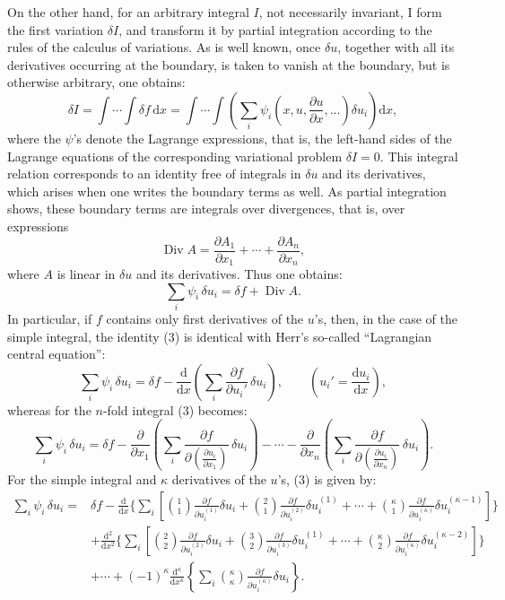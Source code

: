 \documentclass[11pt]{article}
\providecommand{\dd}{\mathrm d}
\providecommand{\Div}{\operatorname{Div}}
\providecommand{\p}{\partial}
\providecommand{\p}{\partial}
\providecommand{\dd}{\mathrm d}
\begin{document}
On the other hand, for an arbitrary integral \(I\), not necessarily invariant, I form the first variation \(\delta I\), and transform it by partial integration according to the rules of the calculus of variations. As is well known, once \(\delta u\), together with all its derivatives occurring at the boundary, is taken to vanish at the boundary, but is otherwise arbitrary, one obtains:
\begin{equation}
\delta I=\int\!\cdots\!\int \delta f\,\dd x
=\int\!\cdots\!\int\left(\sum_i\psi_i\!\left(x,u,\frac{\p u}{\p x},\ldots\right)\delta u_i\right)\dd x,
\tag{2}
\end{equation}
where the \(\psi\)'s denote the Lagrange expressions, that is, the left-hand sides of the Lagrange equations of the corresponding variational problem \(\delta I=0\). This integral relation corresponds to an identity free of integrals in \(\delta u\) and its derivatives, which arises when one writes the boundary terms as well. As partial integration shows, these boundary terms are integrals over divergences, that is, over expressions
\[
\Div A=\frac{\p A_1}{\p x_1}+\cdots+\frac{\p A_n}{\p x_n},
\]
where \(A\) is linear in \(\delta u\) and its derivatives. Thus one obtains:
\begin{equation}
\sum_i\psi_i\,\delta u_i=\delta f+\Div A.
\tag{3}
\end{equation}
In particular, if \(f\) contains only first derivatives of the \(u\)'s, then, in the case of the simple integral, the identity (3) is identical with Herr's so-called ``Lagrangian central equation'':
\begin{equation}
\sum_i \psi_i\,\delta u_i
=\delta f-\frac{\dd}{\dd x}\left(\sum_i\frac{\p f}{\p u_i'}\,\delta u_i\right),
\qquad \left(u_i'=\frac{\dd u_i}{\dd x}\right),
\tag{4}
\end{equation}
whereas for the \(n\)-fold integral (3) becomes:
\begin{equation}
\sum_i\psi_i\,\delta u_i
=
\delta f
-\frac{\p}{\p x_1}\left(\sum_i\frac{\p f}{\p \left(\frac{\p u_i}{\p x_1}\right)}\,\delta u_i\right)
-\cdots
-\frac{\p}{\p x_n}\left(\sum_i\frac{\p f}{\p \left(\frac{\p u_i}{\p x_n}\right)}\,\delta u_i\right).
\tag{5}
\end{equation}
For the simple integral and \(\kappa\) derivatives of the \(u\)'s, (3) is given by:
\begin{equation}
\begin{aligned}
\sum_i\psi_i\,\delta u_i
={}&\delta f
-\frac{\dd}{\dd x}\Bigg\{\sum_i\left[
\binom{1}{1}\frac{\p f}{\p u_i^{(1)}}\delta u_i
+\binom{2}{1}\frac{\p f}{\p u_i^{(2)}}\delta u_i^{(1)}
+\cdots+
\binom{\kappa}{1}\frac{\p f}{\p u_i^{(\kappa)}}\delta u_i^{(\kappa-1)}
\right]\Bigg\}\\
&+\frac{\dd^2}{\dd x^2}\Bigg\{\sum_i\left[
\binom{2}{2}\frac{\p f}{\p u_i^{(2)}}\delta u_i
+\binom{3}{2}\frac{\p f}{\p u_i^{(3)}}\delta u_i^{(1)}
+\cdots+
\binom{\kappa}{2}\frac{\p f}{\p u_i^{(\kappa)}}\delta u_i^{(\kappa-2)}
\right]\Bigg\}\\
&+\cdots
+(-1)^\kappa\frac{\dd^\kappa}{\dd x^\kappa}
\left\{\sum_i\binom{\kappa}{\kappa}
\frac{\p f}{\p u_i^{(\kappa)}}\delta u_i\right\}.
\end{aligned}
\tag{6}
\end{equation}
\end{document}
